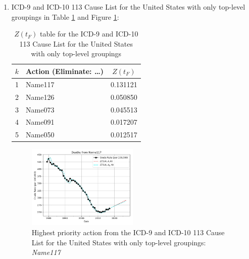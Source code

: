 \documentclass[10pt, a4paper, twocolumn]{IEEEconf}
\begin{document}
\begin{enumerate}
  \item ICD-9 and ICD-10 113 Cause List for the United States with only top-level groupings in Table \ref{table:ztable3} and Figure \ref{fig:k3}:
    \begin{table}[H]
      \centering
      \begin{tabular}{clc}
        \toprule
          $k$ & Action (Eliminate: \ldots) & $Z(t_F)$ \\
        \midrule
          1   & Name117 & 0.131121 \\
          2   & Name126 & 0.050850 \\
          3   & Name073 & 0.045513 \\
          4   & Name091 & 0.017207 \\
          5   & Name050 & 0.012517 \\
        \bottomrule
      \end{tabular}
      \caption{$Z(t_F)$ table for the ICD-9 and ICD-10 113 Cause List for the United States with only top-level groupings}
      \label{table:ztable3}
    \end{table}
    \begin{figure}[H]
      \centering
      \includegraphics[width=0.5\textwidth]{results/US_ICD_113_SELECTED_CAUSES_ROOTS/Name117_ets.png}
      \caption{Highest priority action from the ICD-9 and ICD-10 113 Cause List for the United States with only top-level groupings: \textit{Name117}}\label{fig:k3}
    \end{figure}


\end{enumerate}
\end{document}
